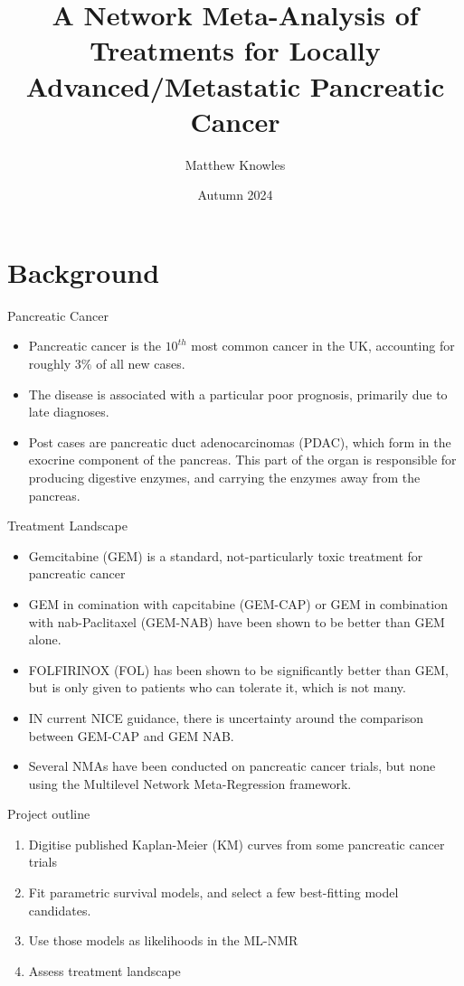 \documentclass{beamer}
\title{A Network Meta-Analysis of Treatments for Locally Advanced/Metastatic Pancreatic Cancer}
\author{Matthew Knowles}
\institute{University of Sheffield}
\date{Autumn 2024}
\begin{document}
\begin{frame}
    \titlepage
\end{frame} 

\section{Background}

\begin{frame}{Pancreatic Cancer}
    \begin{itemize}
        \item Pancreatic cancer is the $10^{th}$ most common cancer in the UK, accounting for roughly $3\%$ of all new cases. 
        \item The disease is associated with a particular poor prognosis, primarily due to late diagnoses.
        \item Post cases are pancreatic duct  adenocarcinomas (PDAC), which form in the exocrine component of the pancreas. This part of the organ is responsible for producing digestive enzymes, and carrying the enzymes away from the pancreas. 
    \end{itemize}
\end{frame}

\begin{frame}{Treatment Landscape}
    \begin{itemize}
        \item Gemcitabine (GEM) is a standard, not-particularly toxic treatment for pancreatic cancer
        \item GEM in comination with capcitabine (GEM-CAP) or GEM in combination with nab-Paclitaxel (GEM-NAB) have been shown to be better than GEM alone.
        \item FOLFIRINOX (FOL) has been shown to be significantly better than GEM, but is only given to patients who can tolerate it, which is not many. 
        \item IN current NICE guidance, there is uncertainty around the comparison between GEM-CAP and GEM NAB.
        \item Several NMAs have been conducted on pancreatic cancer trials, but none using the Multilevel Network Meta-Regression framework.
    \end{itemize} 
\end{frame}

\begin{frame}{Project outline}
    \begin{enumerate}
        \item Digitise published Kaplan-Meier (KM) curves from some pancreatic cancer trials
        \pause
        \item Fit parametric survival models, and select a few best-fitting model candidates.
        \pause
        \item Use those models as likelihoods in the ML-NMR
        \pause
        \item Assess treatment landscape
    \end{enumerate} 
\end{frame} 
\end{document}
